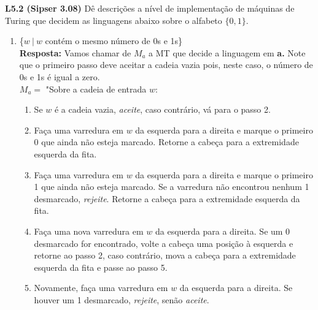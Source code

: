 
\noindent \textbf{L5.2 (Sipser 3.08)} Dê descrições a nível de implementação de máquinas de Turing que decidem as linguagens abaixo sobre o alfabeto $\{0, 1\}$.
\begin{enumerate}[label={\textbf{\alph*.}}]
\item \{$w\ |\ w$ contém o mesmo número de 0s e 1s\}\\[3pt]
\textbf{Resposta: } Vamos chamar de $M_a$ a MT que decide a linguagem em \textbf{a.} Note que o primeiro passo deve aceitar a cadeia vazia pois, neste caso, o número de 0s e 1s é igual a zero.\\[3pt]
$M_a = $ "Sobre a cadeia de entrada $w$:
\begin{enumerate}[label={\textbf{\arabic*.}}, leftmargin=1in]
\item Se $w$ é a cadeia vazia, \textit{aceite}, caso contrário, vá para o passo 2.
\item Faça uma varredura em $w$ da esquerda para a direita e marque o primeiro 0 que ainda não esteja marcado. Retorne a cabeça para a extremidade esquerda da fita.
\item Faça uma varredura em $w$ da esquerda para a direita e marque o primeiro 1 que ainda não esteja marcado. Se a varredura não encontrou nenhum 1 desmarcado, \textit{rejeite}. Retorne a cabeça para a extremidade esquerda da fita.
\item Faça uma nova varredura em $w$ da esquerda para a direita. Se um 0 desmarcado for encontrado, volte a cabeça uma posição à esquerda e retorne ao passo 2, caso contrário, mova a cabeça para a extremidade esquerda da fita e passe ao passo 5.
\item Novamente, faça uma varredura em $w$ da esquerda para a direita. Se houver um 1 desmarcado, \textit{rejeite}, senão \textit{aceite}.
\end{enumerate}


\end{enumerate}
